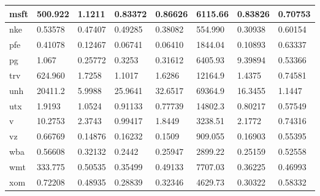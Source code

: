 \begin{table}[H]
\begin{tabularx}{0.5\textwidth}{| X | X | X | X | X | X | X | X |}
msft & 500.922 & 1.1211 & 0.83372 & 0.86626 & 6115.66 & 0.83826 & 0.70753 \\ \hline
nke & 0.53578 & 0.47407 & 0.49285 & 0.38082 & 554.990 & 0.30938 & 0.60154 \\ \hline
pfe & 0.41078 & 0.12467 & 0.06741 & 0.06410 & 1844.04 & 0.10893 & 0.63337 \\ \hline
pg & 1.067 & 0.25772 & 0.3253 & 0.31612 & 6405.93 & 9.39894 & 0.53366 \\ \hline
trv	& 624.960 & 1.7258 & 1.1017 & 1.6286 & 12164.9 & 1.4375 & 0.74581 \\ \hline
unh & 20411.2 & 5.9988 & 25.9641 & 32.6517 & 69364.9 & 16.3455 & 1.1447 \\ \hline
utx	& 1.9193 & 1.0524 & 0.91133 & 0.77739 & 14802.3 & 0.80217 & 0.57549 \\ \hline
v & 10.2753 & 2.3743 & 0.99417 & 1.8449 & 3238.51 & 2.1772 & 0.74316 \\ \hline
vz & 0.66769 & 0.14876 & 0.16232 & 0.1509 & 909.055 & 0.16903 & 0.55395 \\ \hline
wba & 0.56608 & 0.32132 & 0.2442 & 0.25947 & 2899.22 & 0.25159 & 0.52558 \\ \hline
wmt & 333.775 & 0.50535 & 0.35499 & 0.49133 & 7707.03 & 0.36225 & 0.46993 \\ \hline
xom & 0.72208 & 0.48935 & 0.28839 & 0.32346 & 4629.73 & 0.30322 & 0.58332 \\ \hline



\end{tabularx}
\label{Pinouts}
\end{table}